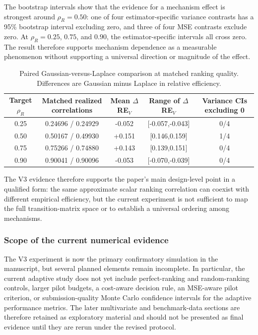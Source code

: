 \documentclass[12pt]{article}
\begin{document}
The bootstrap intervals show that the evidence for a mechanism effect is strongest around $\rho_R=0.50$: one of four estimator-specific variance contrasts has a 95\% bootstrap interval excluding zero, and three of four MSE contrasts exclude zero. At $\rho_R=0.25$, $0.75$, and $0.90$, the estimator-specific intervals all cross zero. The result therefore supports mechanism dependence as a measurable phenomenon without supporting a universal direction or magnitude of the effect.

\begin{table}[htbp]
\centering
\caption{Paired Gaussian-versus-Laplace comparison at matched ranking quality. Differences are Gaussian minus Laplace in relative efficiency.}
\label{tab:v3_paired_mechanism}
\begin{tabular}{ccccc}
\toprule
Target $\rho_R$ & Matched realized correlations & Mean $\Delta$RE$_V$ & Range of $\Delta$RE$_V$ & Variance CIs excluding 0 \\
\midrule
0.25 & 0.24696 / 0.24929 & -0.052 & [-0.057,-0.043] & 0/4 \\
0.50 & 0.50167 / 0.49930 & +0.151 & [0.146,0.159] & 1/4 \\
0.75 & 0.75266 / 0.74880 & +0.143 & [0.139,0.151] & 0/4 \\
0.90 & 0.90041 / 0.90096 & -0.053 & [-0.070,-0.039] & 0/4 \\
\bottomrule
\end{tabular}
\end{table}

The V3 evidence therefore supports the paper's main design-level point in a qualified form: the same approximate scalar ranking correlation can coexist with different empirical efficiency, but the current experiment is not sufficient to map the full transition-matrix space or to establish a universal ordering among mechanisms.

\subsubsection{Scope of the current numerical evidence}
The V3 experiment is now the primary confirmatory simulation in the manuscript, but several planned elements remain incomplete. In particular, the current adaptive study does not yet include perfect-ranking and random-ranking controls, larger pilot budgets, a cost-aware decision rule, an MSE-aware pilot criterion, or submission-quality Monte Carlo confidence intervals for the adaptive performance metrics. The later multivariate and benchmark-data sections are therefore retained as exploratory material and should not be presented as final evidence until they are rerun under the revised protocol.
\end{document}
